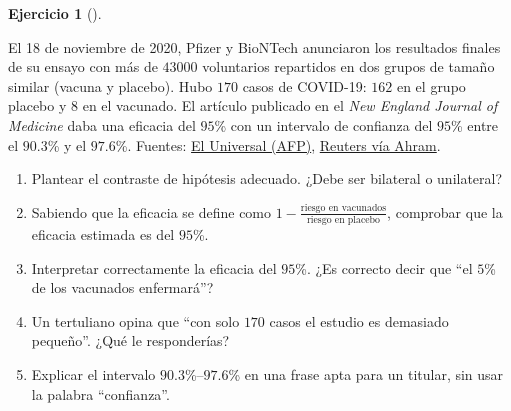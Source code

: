 \documentclass[
  spanish,
  a4paper,
]{scrreport}
\theoremstyle{definition}
\newtheorem{exercise}{Ejercicio}[chapter]
\theoremstyle{remark}
\begin{document}
\begin{exercise}[]\protect\hypertarget{exr-interpretacion-vacuna-pfizer}{}\label{exr-interpretacion-vacuna-pfizer}

El 18 de noviembre de 2020, Pfizer y BioNTech anunciaron los resultados
finales de su ensayo con más de \(43000\) voluntarios repartidos en dos
grupos de tamaño similar (vacuna y placebo). Hubo \(170\) casos de
COVID-19: \(162\) en el grupo placebo y \(8\) en el vacunado. El
artículo publicado en el \emph{New England Journal of Medicine} daba una
eficacia del \(95\)\% con un intervalo de confianza del \(95\)\% entre
el \(90.3\)\% y el \(97.6\)\%. Fuentes:
\href{https://www.eluniversal.com.mx/mundo/vacuna-coronavirus-pfizer-dice-que-tiene-una-efectividad-del-95}{El
Universal (AFP)},
\href{https://english.ahram.org.eg/News/394086.aspx}{Reuters vía Ahram}.

\begin{enumerate}
\def\labelenumi{\alph{enumi}.}
\item
  Plantear el contraste de hipótesis adecuado. ¿Debe ser bilateral o
  unilateral?
\item
  Sabiendo que la eficacia se define como
  \(1-\frac{\text{riesgo en vacunados}}{\text{riesgo en placebo}}\),
  comprobar que la eficacia estimada es del \(95\)\%.
\item
  Interpretar correctamente la eficacia del \(95\)\%. ¿Es correcto decir
  que ``el \(5\)\% de los vacunados enfermará''?
\item
  Un tertuliano opina que ``con solo \(170\) casos el estudio es
  demasiado pequeño''. ¿Qué le responderías?
\item
  Explicar el intervalo \(90.3\)\%--\(97.6\)\% en una frase apta para un
  titular, sin usar la palabra ``confianza''.
\end{enumerate}

\end{exercise}
\end{document}
